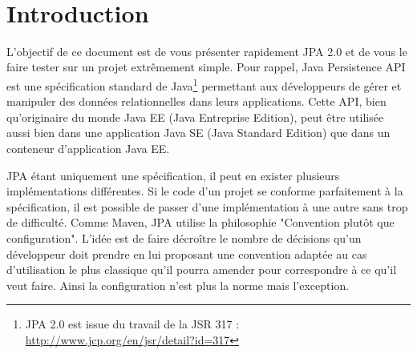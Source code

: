 \documentclass[a4paper,11pt]{article}
\date{}
\begin{document}

\newlength{\niveauZero}
\newlength{\niveauUn}
\newlength{\niveauDeux}
\newlength{\niveauTrois}
\newlength{\niveauQuatre}
\newlength{\niveauCinq}

\newlength{\colonneZero}
\newlength{\colonneUn}
\newlength{\colonneDeux}
\newlength{\colonneTrois}
\newlength{\colonneQuatre}
\newlength{\colonneCinq}


{\centering
    \mbox{
    }
}\\[0.4cm]
\section{Introduction}
L'objectif de ce document est de vous présenter rapidement JPA 2.0 et de vous le faire tester sur un projet extrêmement 
simple. Pour rappel, Java Persistence API est une spécification standard de Java\footnote{JPA 2.0 est issue du travail de 
la JSR 317 : \url{http://www.jcp.org/en/jsr/detail?id=317}} permettant aux développeurs de gérer et manipuler des données 
relationnelles dans leurs applications. Cette API, bien qu'originaire du monde Java EE (Java Entreprise Edition), peut être 
utilisée aussi bien dans une application Java SE (Java Standard Edition) que dans un conteneur d'application Java EE.

JPA étant uniquement une spécification, il peut en exister plusieurs implémentations différentes. Si le code d'un projet
se conforme parfaitement à la spécification, il est possible de passer d'une implémentation à une autre sans trop de 
difficulté. Comme Maven, JPA utilise la philosophie "Convention plutôt que configuration". L'idée est de faire décroître 
le nombre de décisions qu'un développeur doit prendre en lui proposant une convention adaptée au cas d'utilisation 
le plus classique qu'il pourra amender pour correspondre à ce qu'il veut faire. Ainsi la configuration n'est plus la 
norme mais l'exception.
\end{document}
